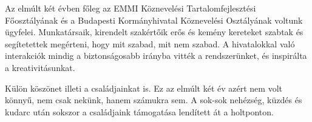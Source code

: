 Az elmúlt két évben főleg az EMMI Köznevelési Tartalomfejlesztési Főosztályának és a Budapesti Kormányhivatal Köznevelési Osztályának voltunk ügyfelei. Munkatársaik, kirendelt szakértőik erős és kemény kereteket szabtak és segítetettek megérteni, hogy mit szabad, mit nem szabad. A hivatalokkal való interakciók mindig a biztonságosabb irányba vitték a rendszerünket, és inspirálta a kreativitásunkat. 
 
Külön köszönet illeti a családjainkat is. Ez az elmúlt két év azért nem volt könnyű, nem csak nekünk, hanem számukra sem. A sok-sok nehézség, küzdés és kudarc után sokszor a családjaink támogatása lendített át a holtponton. 

